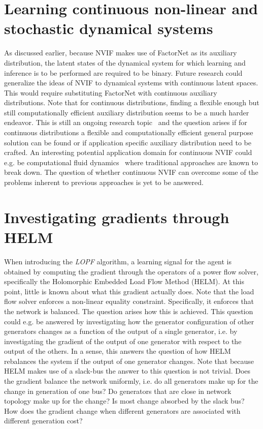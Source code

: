 \documentclass[11pt]{cmuthesis} %
\begin{document}
\section{Learning continuous non-linear and stochastic dynamical systems}

As discussed earlier, because NVIF makes use of FactorNet as its auxiliary distribution, the latent states of the dynamical system for which learning and inference is to be performed are required to be binary. Future research could generalize the ideas of NVIF to dynamical systems with continuous latent spaces. This would require substituting FactorNet with continuous auxiliary distributions. Note that for continuous distributions, finding a flexible enough but still computationally efficient auxiliary distribution seems to be a much harder endeavor. This is still an ongoing research topic~\cite{grathwohl2018ffjord} and the question arises if for continuous distributions a flexible and computationally efficient general purpose solution can be found or if application specific auxiliary distribution need to be crafted. An interesting potential application domain for continuous NVIF could e.g. be computational fluid dynamics~\cite{anderson1995computational} where traditional approaches are known to break down. The question of whether continuous NVIF can overcome some of the problems inherent to previous approaches is yet to be answered.

\section{Investigating gradients through HELM}
When introducing the \emph{LOPF} algorithm, a learning signal for the agent is obtained by computing the gradient through the operators of a power flow solver, specifically the Holomorphic Embedded Load Flow Method (HELM). At this point, little is known about what this gradient actually does. Note that the load flow solver enforces a non-linear equality constraint. Specifically, it enforces that the network is balanced. The question arises how this is achieved. This question could e.g. be answered by investigating how the generator configuration of other generators changes as a function of the output of a single generator, i.e. by investigating the gradient of the output of one generator with respect to the output of the others. In a sense, this answers the question of how HELM rebalances the system if the output of one generator changes. Note that because HELM makes use of a slack-bus the answer to this question is not trivial. Does the gradient balance the network uniformly, i.e. do all generators make up for the change in generation of one bus? Do generators that are close in network topology make up for the change? Is most change absorbed by the slack bus? How does the gradient change when different generators are associated with different generation cost?
\end{document}
